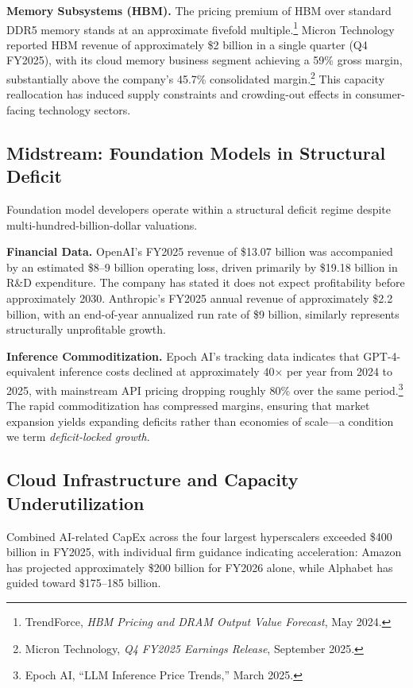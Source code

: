 \documentclass[11pt,letterpaper]{article}
\begin{document}
\textbf{Memory Subsystems (HBM).} The pricing premium of HBM over standard DDR5 memory stands at an approximate fivefold multiple.\footnote{TrendForce, \textit{HBM Pricing and DRAM Output Value Forecast}, May 2024.} Micron Technology reported HBM revenue of approximately \$2 billion in a single quarter (Q4 FY2025), with its cloud memory business segment achieving a 59\% gross margin, substantially above the company's 45.7\% consolidated margin.\footnote{Micron Technology, \textit{Q4 FY2025 Earnings Release}, September 2025.} This capacity reallocation has induced supply constraints and crowding-out effects in consumer-facing technology sectors.

\subsection{Midstream: Foundation Models in Structural Deficit}

Foundation model developers operate within a structural deficit regime despite multi-hundred-billion-dollar valuations.

\textbf{Financial Data.} OpenAI's FY2025 revenue of \$13.07 billion was accompanied by an estimated \$8--9 billion operating loss, driven primarily by \$19.18 billion in R\&D expenditure. The company has stated it does not expect profitability before approximately 2030. Anthropic's FY2025 annual revenue of approximately \$2.2 billion, with an end-of-year annualized run rate of \$9 billion, similarly represents structurally unprofitable growth.

\textbf{Inference Commoditization.} Epoch AI's tracking data indicates that GPT-4-equivalent inference costs declined at approximately 40$\times$ per year from 2024 to 2025, with mainstream API pricing dropping roughly 80\% over the same period.\footnote{Epoch AI, ``LLM Inference Price Trends,'' March 2025.} The rapid commoditization has compressed margins, ensuring that market expansion yields expanding deficits rather than economies of scale---a condition we term \textit{deficit-locked growth}.

\subsection{Cloud Infrastructure and Capacity Underutilization}

Combined AI-related CapEx across the four largest hyperscalers exceeded \$400 billion in FY2025, with individual firm guidance indicating acceleration: Amazon has projected approximately \$200 billion for FY2026 alone, while Alphabet has guided toward \$175--185 billion.
\end{document}
